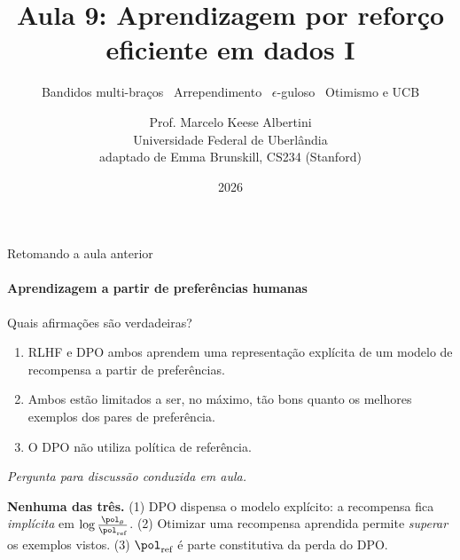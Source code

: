 \documentclass[aspectratio=169, 10pt]{beamer}
\title[Aula 9 — Bandidos e arrependimento]{Aula 9: Aprendizagem por reforço\\ eficiente em dados I}
\subtitle[Aprendizagem por Reforço]{Bandidos multi-braços \textbullet\ Arrependimento \textbullet\ $\epsilon$-guloso \textbullet\ Otimismo e UCB}
\author[Prof. Marcelo K. Albertini]{Prof. Marcelo Keese Albertini \\
  \footnotesize Universidade Federal de Uberlândia \\
  \footnotesize adaptado de Emma Brunskill, CS234 (Stanford)}
\institute{Universidade Federal de Uberlândia}
\date{2026}
\newcommand{\paradiscussao}{\smallskip
  {\footnotesize\color{rlCinza}\itshape Pergunta para discussão conduzida em aula.}}
\begin{document}
\begin{frame}\titlepage\end{frame}

\begin{frame}{Retomando a aula anterior}
  \framesubtitle{Aprendizagem a partir de preferências humanas}

  \begin{quizbox}[fontupper=\footnotesize]{}
    Quais afirmações são verdadeiras?
    \begin{enumerate}\setlength{\itemsep}{0ex}
      \item RLHF e DPO ambos aprendem uma representação \alert{explícita}
            de um modelo de recompensa a partir de preferências.
      \item Ambos estão limitados a ser, no máximo, tão bons quanto os
            melhores exemplos dos pares de preferência.
      \item O DPO não utiliza política de referência.
    \end{enumerate}
    \paradiscussao
  \end{quizbox}

  \pause

  \begin{respbox}[fontupper=\footnotesize]
    \textbf{Nenhuma das três.} (1) DPO dispensa o modelo explícito: a
    recompensa fica \emph{implícita} em
    $\log\frac{\pol_\theta}{\pol_{\text{ref}}}$. (2) Otimizar uma recompensa
    aprendida permite \emph{superar} os exemplos vistos. (3)
    $\pol_{\text{ref}}$ é parte constitutiva da perda do DPO.
  \end{respbox}
\end{frame}
\end{document}
